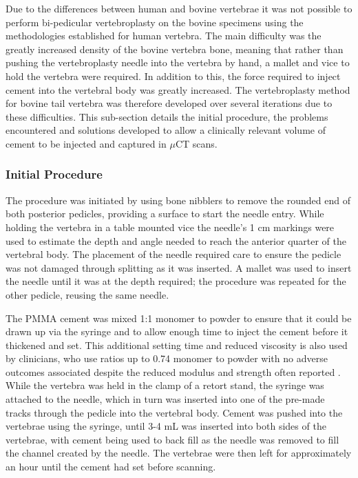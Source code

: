 Due to the differences between human and bovine
vertebrae it was not possible to perform bi-pedicular vertebroplasty on the
bovine specimens using the methodologies established for human vertebra.  The
main difficulty was the greatly increased density of the bovine vertebra bone,
meaning that rather than pushing the vertebroplasty needle into the vertebra by
hand, a mallet and vice to hold the vertebra were required. In addition to
this, the force required to inject cement into the vertebral body was greatly
increased.  The vertebroplasty method for bovine tail vertebra was therefore
developed over several iterations due to these difficulties. This sub-section
details the initial procedure, the problems encountered and solutions developed
to allow a clinically relevant volume of cement to be injected and captured in
$\mu$CT scans.

\subsubsection{Initial Procedure}

The procedure was initiated by using bone nibblers to remove the rounded end of
both posterior pedicles, providing a surface to start the needle entry. While
holding the vertebra in a table mounted vice the needle's 1 cm markings were used to
estimate the depth and angle needed to reach the anterior quarter of the
vertebral body. The placement of the needle required care to ensure the pedicle
was not damaged through splitting as it was inserted. A mallet was used to
insert the needle until it was at the depth required; the procedure was
repeated for the other pedicle, reusing the same needle.



The PMMA cement was mixed 1:1 monomer to powder to ensure that it could be
drawn up via the syringe and to allow enough time to inject the cement before
it thickened and set. This additional setting time and reduced viscosity is
also used by clinicians, who use ratios up to 0.74 monomer to powder with no
adverse outcomes associated despite the reduced modulus and strength often
reported \cite{Belkoff2002,Jasper1999}.  While the vertebra was held in the
clamp of a retort stand, the syringe was attached to the needle, which in turn
was inserted into one of the pre-made tracks through the pedicle into the
vertebral body.
Cement was pushed into the vertebrae using the syringe, until 3-4 mL was
inserted into both sides of the vertebrae, with cement being used to back fill
as the needle was removed to fill the channel created by the needle. The
vertebrae were then left for approximately an hour until the cement had set
before scanning.

